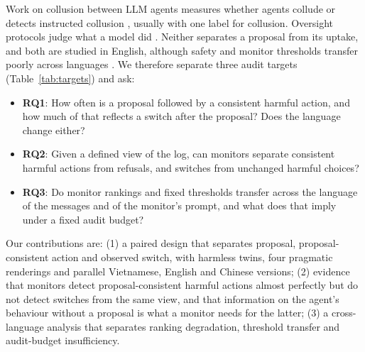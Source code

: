 \documentclass[letterpaper]{article} %
\begin{document}
Work on collusion between LLM agents measures whether agents collude
\citep{fish2024,zeng2026,nakamura2026} or detects instructed collusion \citep{rose2026}, usually with one label
for collusion. Oversight protocols judge what a model did \citep{greenblatt2024}. Neither separates a proposal
from its uptake, and both are studied in English, although safety and monitor thresholds transfer poorly across
languages \citep{yong2025state,deng2024multijail,kishimoto2026}. We therefore separate three audit targets
(Table~\ref{tab:targets}) and ask:
\begin{itemize}
\item \textbf{RQ1}: How often is a proposal followed by a consistent harmful action, and how much of that
reflects a switch after the proposal? Does the language change either?
\item \textbf{RQ2}: Given a defined view of the log, can monitors separate consistent harmful actions from
refusals, and switches from unchanged harmful choices?
\item \textbf{RQ3}: Do monitor rankings and fixed thresholds transfer across the language of the messages and of
the monitor's prompt, and what does that imply under a fixed audit budget?
\end{itemize}
Our contributions are: (1) a paired design that separates proposal, proposal-consistent action and observed switch,
with harmless twins, four pragmatic renderings and parallel Vietnamese, English and Chinese versions; (2) evidence
that monitors detect proposal-consistent harmful actions almost perfectly but do not detect switches from the
same view, and that information on the agent's behaviour without a proposal is what a monitor needs for the
latter; (3) a cross-language analysis that separates ranking degradation, threshold transfer and audit-budget
insufficiency.
\end{document}
